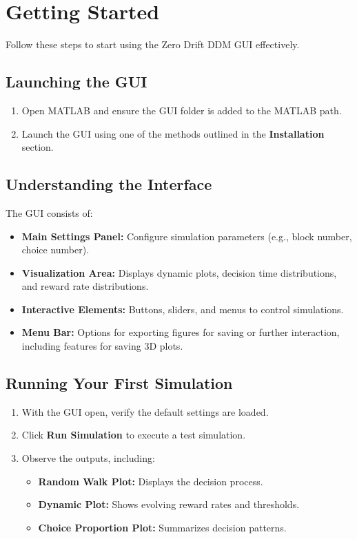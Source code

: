 \chapter{Getting Started}

Follow these steps to start using the Zero Drift DDM GUI effectively.

\section{Launching the GUI}
\begin{enumerate}
    \item Open MATLAB and ensure the GUI folder is added to the MATLAB path.
    \item Launch the GUI using one of the methods outlined in the \textbf{Installation} section.
\end{enumerate}

\section{Understanding the Interface}
The GUI consists of:
\begin{itemize}
    \item \textbf{Main Settings Panel:} Configure simulation parameters (e.g., block number, choice number).
    \item \textbf{Visualization Area:} Displays dynamic plots, decision time distributions, and reward rate distributions.
    \item \textbf{Interactive Elements:} Buttons, sliders, and menus to control simulations.
    \item \textbf{Menu Bar:} Options for exporting figures for saving or further interaction, including features for saving 3D plots.
\end{itemize}

\section{Running Your First Simulation}
\begin{enumerate}
    \item With the GUI open, verify the default settings are loaded.
    \item Click \textbf{Run Simulation} to execute a test simulation.
    \item Observe the outputs, including:
    \begin{itemize}
        \item \textbf{Random Walk Plot:} Displays the decision process.
        \item \textbf{Dynamic Plot:} Shows evolving reward rates and thresholds.
        \item \textbf{Choice Proportion Plot:} Summarizes decision patterns.
    \end{itemize}
\end{enumerate}

